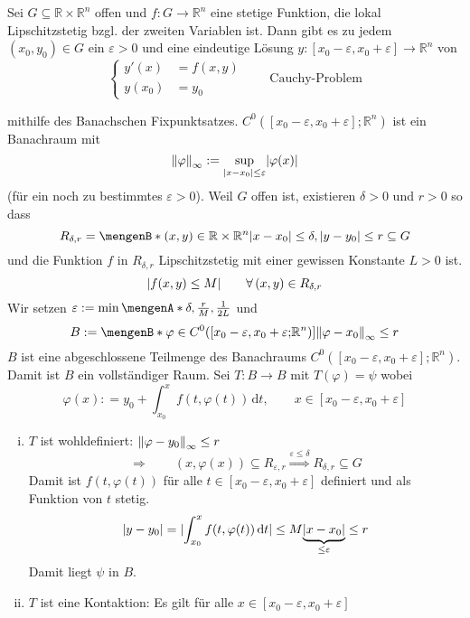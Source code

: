 \begin{satz}
	Sei $G \subseteq \mathbb{R} \times \mathbb{R}^n$ offen und $f: G \to \mathbb{R}^n$ eine stetige Funktion, die lokal Lipschitzstetig bzgl. der zweiten Variablen ist. Dann gibt es zu jedem $(x_0,y_0) \in G$ ein $\varepsilon >0$ und eine eindeutige Lösung $y : [x_0- \varepsilon, x_0 + \varepsilon] \to \mathbb{R}^n$ von
	\[
		\begin{cases}
			y'(x)&=f(x,y)\\
			y(x_0)&= y_0
		\end{cases} \qquad \text{Cauchy-Problem}
	\]
\end{satz}
\begin{beweis}
	mithilfe des Banachschen Fixpunktsatzes. $C^0([x_0- \varepsilon, x_0 + \varepsilon];\mathbb{R}^n)$ ist ein Banachraum mit 
	\[
		\norm{\varphi}_{\infty} := \sup_{\abs{x-x_0} \leq \varepsilon} \abs{\varphi(x)} 
	\]
	(für ein noch zu bestimmtes $\varepsilon >0 $). Weil $G$ offen ist, existieren $\delta >0$ und $r >0$ so dass
	\[
		R_{\delta ,r} = \set[(x,y) \in \mathbb{R} \times \mathbb{R}^n]{\abs{x-x_0} \leq \delta , \abs{y-y_0} \leq r} \subseteq G
	\]
	und die Funktion $f$ in $R_{\delta ,r}$ Lipschitzstetig mit einer gewissen Konstante $L >0$ ist.
	\[
		\lvert f(x,y) \leq M\rvert \qquad  \forall\, (x,y) \in R_{\delta ,r}
	\]
	Wir setzen $\varepsilon := \min \set{\delta , \frac{r}{M}, \frac{1}{2L}}$ und 
	\[
		B:= \set[\varphi \in C^0([x_0- \varepsilon, x_0 + \varepsilon];\mathbb{R}^n)]{\norm{\varphi-x_0}_{\infty} \leq r}
	\]
	$B$ ist eine abgeschlossene Teilmenge des Banachraums $C^0([x_0- \varepsilon, x_0 + \varepsilon]; \mathbb{R}^n)$. Damit ist $B$ ein vollständiger Raum.
	Sei $ T:B \to B$ mit $T(\varphi) = \psi$ wobei
	\[
		\varphi(x) : = y_0 + \int_{x_0}^{x} f(t,\varphi(t)) \,\mathrm{d}t, \qquad x \in [x_0- \varepsilon, x_0 + \varepsilon]
	\]
	\begin{enumerate}[(i)]
		\item $T$ ist wohldefiniert: $\norm{\varphi-y_0}_{\infty} \leq r$
		\[
			\Rightarrow \qquad (x,\varphi(x)) \subseteq R_{\varepsilon,r} \stackrel{\varepsilon \leq \delta }{\Rightarrow } R_{\delta ,r} \subseteq G
		\]
		Damit ist $f(t,\varphi(t))$ für alle $t \in [x_0- \varepsilon, x_0 + \varepsilon]$ definiert und als Funktion von $t$ stetig.
		\[
			\lvert y-y_0\rvert = \lvert\int_{x_0}^{x} f(t,\varphi(t)) \,\mathrm{d}t\rvert \leq M \underset{\leq \varepsilon}{\underbrace{\lvert x-x_0\rvert}} \leq r
		\]
		Damit liegt $\psi$ in $B$.
		\item $T$ ist eine Kontaktion: Es gilt für alle $x \in [x_0 - \varepsilon , x_0 + \varepsilon]$

\end{enumerate}
\end{beweis}
